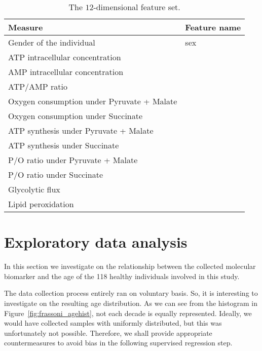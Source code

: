 \begin{table}[]
	\centering
	\caption{The $12$-dimensional feature set.}
	\label{tab:aging_features}
	\begin{tabular}{@{}ll@{}}
		\toprule
		\textbf{Measure}                                    & \textbf{Feature name}\\ \midrule
		Gender of the individual                      & sex          \\
		ATP intracellular concentration            & \atp         \\
		AMP intracellular concentration            & \amp         \\
		ATP/AMP ratio                              & \atpamp      \\
		Oxygen consumption under Pyruvate + Malate & \copyrmal    \\
		Oxygen consumption under Succinate         & \cosucc      \\
		ATP synthesis under Pyruvate + Malate      & \atppyrmal   \\
		ATP synthesis under Succinate              & \atpsucc     \\
		P/O ratio under Pyruvate + Malate          & \popyrmal    \\
		P/O ratio under Succinate                  & \posucc      \\
		Glycolytic flux                            & \ldh         \\
		Lipid peroxidation                         & \mda         \\ \bottomrule
	\end{tabular}
\end{table}


\section{Exploratory data analysis} \label{sec:frassoni_EDA}
In this section we investigate on the relationship between the collected molecular biomarker and the age of the 118 healthy individuals involved in this study.

The data collection process entirely ran on voluntary basis. So, it is interesting to investigate on the resulting age distribution. As we can see from the histogram in Figure~\ref{fig:frassoni_agehist}, not each decade is equally represented. Ideally, we would have collected samples with uniformly distributed, but this was unfortunately not possible. Therefore, we shall provide appropriate countermeasures to avoid bias in the following supervised regression step.


